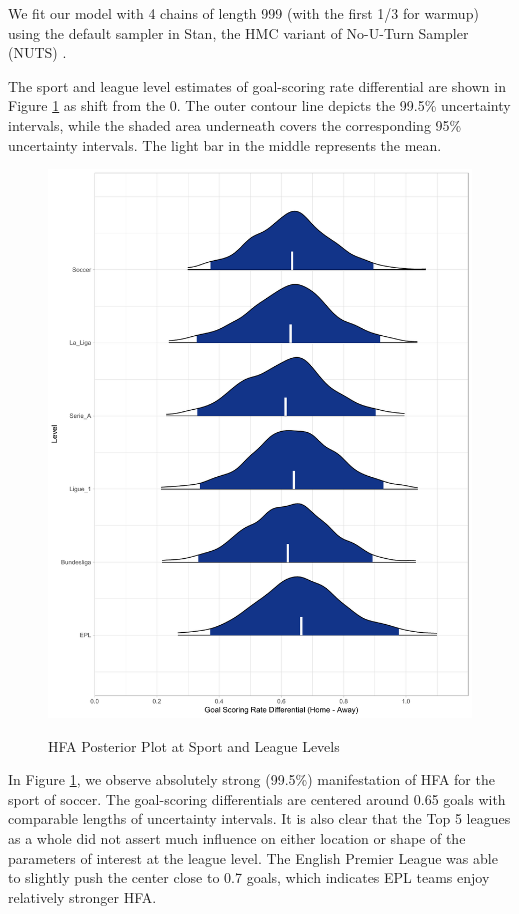 \documentclass[USenglish]{article}
\begin{document}
We fit our model with 4 chains of length 999 (with the first 1/3 for warmup) using the default sampler in Stan, the HMC variant of No-U-Turn Sampler (NUTS) \citep{Hoffman2014}.  

The sport and league level estimates of goal-scoring rate differential are shown in Figure \ref{fig31} as shift from the 0. The outer contour line depicts the 99.5\% uncertainty intervals, while the shaded area underneath covers the corresponding 95\% uncertainty intervals. The light bar in the middle represents the mean.

\begin{figure}
\caption{HFA Posterior Plot at Sport and League Levels}
\centering
{\includegraphics[width=1.00\linewidth]{HFA32.pdf}}
\label{fig31}
\end{figure}

In Figure \ref{fig31}, we observe absolutely strong (99.5\%) manifestation of HFA for the sport of soccer. The goal-scoring differentials are centered around 0.65 goals with comparable lengths of uncertainty intervals.  
It is also clear that the Top 5 leagues as a whole did not assert much influence on either location or shape of the parameters of interest at the league level. The English Premier League was able to slightly push the center close to 0.7 goals, which indicates EPL teams enjoy relatively stronger HFA.
\end{document}
